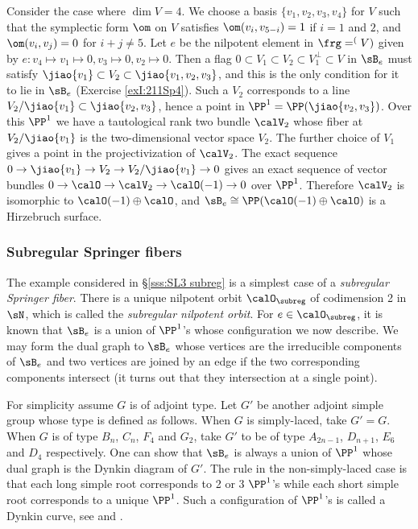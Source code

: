Consider the case where $\dim V=4$. We choose a basis $\{v_{1},v_{2},v_{3},v_{4}\}$ for $V$ such that the symplectic form $\om$ on $V$ satisfies $\om(v_{i},v_{5-i})=1$ if $i=1$ and $2$, and $\om(v_{i},v_{j})=0$ for $i+j\neq 5$. Let $e$ be the nilpotent element in $\frg=\sp(V)$ given by $e:v_{4}\mapsto v_{1}\mapsto 0, v_{3}\mapsto 0,v_{2}\mapsto 0$. Then a flag $0\subset V_{1}\subset V_{2}\subset V_{1}^{\bot}\subset V$ in $\sB_{e}$ must satisfy $\jiao{v_{1}}\subset V_{2}\subset\jiao{v_{1},v_{2},v_{3}}$, and this is the only condition for it to lie in $\sB_{e}$ (Exercise \ref{exI:211Sp4}). Such a $V_{2}$ corresponds to a line $V_{2}/\jiao{v_{1}}\subset \jiao{v_{2},v_{3}}$, hence a point in $\PP^{1}=\PP(\jiao{v_{2},v_{3}})$. Over this $\PP^{1}$ we have a tautological rank two bundle $\calV_{2}$ whose fiber at $V_{2}/\jiao{v_{1}}$ is the two-dimensional vector space $V_{2}$. The further choice of $V_{1}$ gives a point in the projectivization of $\calV_{2}$. The exact sequence $0\to\jiao{v_{1}}\to V_{2}\to V_{2}/\jiao{v_{1}}\to0$ gives an exact sequence of vector bundles $0\to\calO\to\calV_{2}\to\calO(-1)\to0$ over $\PP^{1}$. Therefore $\calV_{2}$ is isomorphic to $\calO(-1)\oplus\calO$, and $\sB_{e}\cong \PP(\calO(-1)\oplus\calO)$ is a Hirzebruch surface.



  
\subsubsection{Subregular Springer fibers}\label{sss:subreg} The example considered in \S\ref{sss:SL3 subreg} is a simplest case of a {\em subregular Springer fiber}. There is a unique nilpotent orbit $\calO_{\subreg}$ of codimension 2 in $\sN$, which is called the {\em subregular nilpotent orbit}. For $e\in\calO_{\subreg}$, it is known that $\sB_{e}$ is a union of $\PP^{1}$'s whose configuration we now describe. We may form the dual graph to $\sB_{e}$ whose vertices are the irreducible components of $\sB_{e}$ and two vertices are joined by an edge if the two corresponding components intersect (it turns out that they intersection at a single point).

For simplicity assume $G$ is of adjoint type. Let $G'$ be another adjoint simple group whose type is defined as follows. When $G$ is simply-laced, take $G'=G$. When $G$ is of type $B_{n}$, $C_{n}$, $F_{4}$ and $G_{2}$, take $G'$ to be of type $A_{2n-1}$, $D_{n+1}$, $E_{6}$ and $D_{4}$ respectively. One can show that $\sB_{e}$ is always a union of $\PP^{1}$ whose dual graph is the Dynkin diagram of $G'$. The rule in the non-simply-laced case is that each long simple root corresponds to 2 or 3 $\PP^{1}$'s while each short simple root corresponds to a unique $\PP^{1}$. Such a configuration of $\PP^{1}$'s is called a Dynkin curve, see \cite[\S3.10, Definition and Prop 2]{StConj} and \cite[\S6.3]{Slodowy}.

